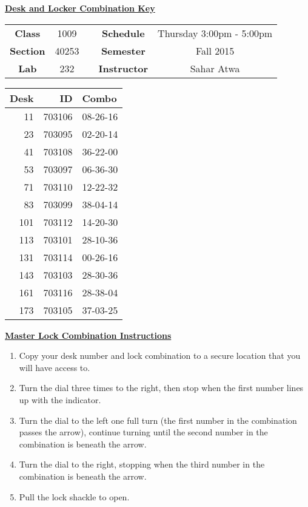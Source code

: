 \documentclass[12pt]{article}
\begin{document}
\thispagestyle{empty}

\begin{center}
	{\huge\textbf{\underline{ Desk and Locker Combination Key}}}
\end{center}


\begin{table}[h]
  \centering
  \begin{tabular}{ccccc}

  \textbf{Class} & 1009 & {\qquad} &\textbf{Schedule} & Thursday 3:00pm - 5:00pm \\
  \textbf{Section} & 40253 & {\qquad} & \textbf{Semester} & Fall 2015 \\
  \textbf{Lab} & 232 & {\qquad} & \textbf{Instructor} & Sahar Atwa \\
  \end{tabular}
\end{table}
 \vspace{0.5in}
\begin{minipage}{0.4\textwidth}

\begin{tabular}{rrl}
\toprule
 Desk &      ID &     Combo \\
\midrule
   11 &  703106 &  08-26-16 \\
   23 &  703095 &  02-20-14 \\
   41 &  703108 &  36-22-00 \\
   53 &  703097 &  06-36-30 \\
   71 &  703110 &  12-22-32 \\
   83 &  703099 &  38-04-14 \\
  101 &  703112 &  14-20-30 \\
  113 &  703101 &  28-10-36 \\
  131 &  703114 &  00-26-16 \\
  143 &  703103 &  28-30-36 \\
  161 &  703116 &  28-38-04 \\
  173 &  703105 &  37-03-25 \\
\bottomrule
\end{tabular}


\end{minipage}
\begin{minipage}{0.4\textwidth}
\underline{{\large \textbf{Master Lock Combination Instructions}}}
\begin{enumerate}
\item Copy your desk number and lock combination to a secure location that you will have access to.
\item Turn the dial three times to the right, then stop when the first number lines up with the indicator.
\item Turn the dial to the left one full turn (the first number in the combination passes the arrow), continue turning until the second number in the combination is beneath the arrow.
\item Turn the dial to the right, stopping when the third number in the combination is beneath the arrow.
\item Pull the lock shackle to open.
\end{enumerate}
\end{minipage}
\end{document}
